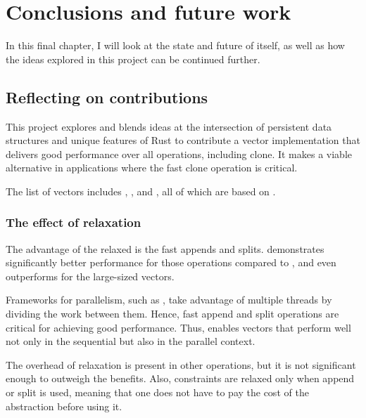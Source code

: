 

\chapter{Conclusions and future work}
In this final chapter, I will look at the state and future of \pvecrs{} itself, as well as how the ideas explored in this project can be continued further.

\section{Reflecting on contributions}
This project explores and blends ideas at the intersection of persistent data structures and unique features of Rust to contribute a vector implementation that delivers good performance over all operations, including clone. It makes \pvecrs{} a viable alternative in applications where the fast clone operation is critical.

The list of vectors includes \rbvec{}, \rrbvec{}, and \pvec{}, all of which are based on \rrbtree{}.

\subsection{The effect of relaxation}
The advantage of the relaxed \rbtree{} is the fast appends and splits. \rrbvec{} demonstrates significantly better performance for those operations compared to \rbvec{}, and even outperforms \stdvec{} for the large-sized vectors.

Frameworks for parallelism, such as \rayon{}, take advantage of multiple threads by dividing the work between them. Hence, fast append and split operations are critical for achieving good performance. Thus, \rrbtree{} enables vectors that perform well not only in the sequential but also in the parallel context.

The overhead of relaxation is present in other operations, but it is not significant enough to outweigh the benefits. Also, constraints are relaxed only when append or split is used, meaning that one does not have to pay the cost of the abstraction before using it.

